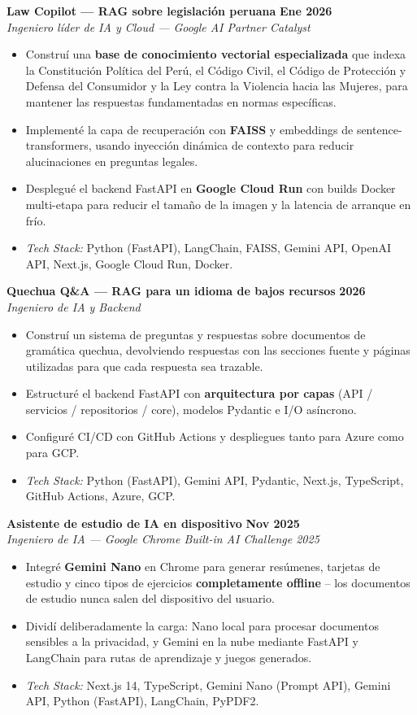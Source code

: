 \documentclass[11pt,letterpaper]{article}
\newcommand{\cventry}[4]{%
  \textbf{#1} \hfill \textbf{#2}\\
  \textit{#3} \hfill \textit{#4}\par\nobreak\vspace{1pt}%
}
\begin{document}
\cventry{Law Copilot --- RAG sobre legislación peruana}{Ene 2026}{Ingeniero líder de IA y Cloud --- Google AI Partner Catalyst}{}
\begin{itemize}
  \item Construí una \textbf{base de conocimiento vectorial especializada} que indexa la Constitución Política del Perú, el Código Civil, el Código de Protección y Defensa del Consumidor y la Ley contra la Violencia hacia las Mujeres, para mantener las respuestas fundamentadas en normas específicas.
  \item Implementé la capa de recuperación con \textbf{FAISS} y embeddings de sentence-transformers, usando inyección dinámica de contexto para reducir alucinaciones en preguntas legales.
  \item Desplegué el backend FastAPI en \textbf{Google Cloud Run} con builds Docker multi-etapa para reducir el tamaño de la imagen y la latencia de arranque en frío.
  \item \textit{Tech Stack:} Python (FastAPI), LangChain, FAISS, Gemini API, OpenAI API, Next.js, Google Cloud Run, Docker.
\end{itemize}

\cventry{Quechua Q\&A --- RAG para un idioma de bajos recursos}{2026}{Ingeniero de IA y Backend}{}
\begin{itemize}
  \item Construí un sistema de preguntas y respuestas sobre documentos de gramática quechua, devolviendo respuestas con las secciones fuente y páginas utilizadas para que cada respuesta sea trazable.
  \item Estructuré el backend FastAPI con \textbf{arquitectura por capas} (API / servicios / repositorios / core), modelos Pydantic e I/O asíncrono.
  \item Configuré CI/CD con GitHub Actions y despliegues tanto para Azure como para GCP.
  \item \textit{Tech Stack:} Python (FastAPI), Gemini API, Pydantic, Next.js, TypeScript, GitHub Actions, Azure, GCP.
\end{itemize}

\cventry{Asistente de estudio de IA en dispositivo}{Nov 2025}{Ingeniero de IA --- Google Chrome Built-in AI Challenge 2025}{}
\begin{itemize}
  \item Integré \textbf{Gemini Nano} en Chrome para generar resúmenes, tarjetas de estudio y cinco tipos de ejercicios \textbf{completamente offline} -- los documentos de estudio nunca salen del dispositivo del usuario.
  \item Dividí deliberadamente la carga: Nano local para procesar documentos sensibles a la privacidad, y Gemini en la nube mediante FastAPI y LangChain para rutas de aprendizaje y juegos generados.
  \item \textit{Tech Stack:} Next.js 14, TypeScript, Gemini Nano (Prompt API), Gemini API, Python (FastAPI), LangChain, PyPDF2.
\end{itemize}
\end{document}
